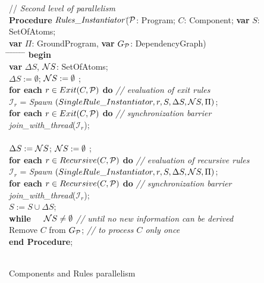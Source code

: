\documentclass[preprint]{tlp}
\newcommand{\DNF}{\ensuremath{\Delta S}\xspace}
\newcommand{\NNF}{\ensuremath{{\cal N}S}\xspace}
\newcommand{\gpii}{\mbox{$\Pi$}}
\newcommand{\p}{\ensuremath{{\cal P}}\xspace}
\newcommand{\dgp}{\mbox{$G_{\p}$}}
\begin{document}
\begin{figure}[t!]
\begin{center}
\begin{small}
\begin{tabbing}
// {\em Second level of parallelism}\\
{\bf Procedure} $\mathit{Rules\_Instantiator\/}$\=($\p$: Program; $C$: Component;
{\bf var} $S$: SetOfAtoms; \\
                                     \> {\bf var} $\gpii$: GroundProgram, {\bf var} $\dgp$: DependencyGraph)\\
\hspace*{0.2cm} \= \kill
\hspace*{0.4cm} \= \hspace*{0.4cm} \= \hspace*{0.4cm} \=
\hspace*{0.4cm} \= \hspace*{0.4cm} \= \hspace*{3cm} \=\kill
{\bf begin} \\
\> {\bf var} $\DNF$, $\NNF$: SetOfAtoms;\\
\> $\DNF := \emptyset$; $\NNF := \emptyset$ ; \\
\> {\bf for each} $r \in Exit(C, \p)$ {\bf do} \hspace{1.5cm} {\em // evaluation of exit rules} \\
\>\>$\mathcal{I}_r$ = {\em Spawn} $(SingleRule\_Instantiator, r, S,\DNF,\NNF,\gpii)$; \\
\> {\bf for each} $r \in Exit(C, \p)$ {\bf do} \hspace{1.48cm} {\em // synchronization barrier} \\
\>\> {\em join\_with\_thread}($\mathcal{I}_r$); \\
 \\
\>\> $\DNF := \NNF$; $\NNF := \emptyset$ ; \\
\>\>  {\bf for each} $r \in Recursive(C, \p)$ {\bf do}  \hspace{0.2cm} {\em // evaluation of recursive rules} \\
\> \> \> $\mathcal{I}_r$ = {\em Spawn} $(SingleRule\_Instantiator, r, S,\DNF,\NNF,\gpii)$; \\
\>\>  {\bf for each} $r \in Recursive(C, \p)$ {\bf do} \hspace{0.2cm} {\em // synchronization barrier} \\
\>\>\> {\em join\_with\_thread}($\mathcal{I}_r$); \\
\> \> $S := S \cup \DNF$; \\
\> {\bf while \ \ $\NNF \neq \emptyset$} \hspace{3.2cm} {\em // until no new information can be derived} \\
\> Remove $C$ from $\dgp$; \hspace{2.55cm} {\em // to process $C$ only once} \\
{\bf end Procedure}; \\ \\
\end{tabbing}
\end{small}
\caption{Components and Rules parallelism}\label{fig:parallelInstantiation1}
\end{center}
\end{figure}
\end{document}
